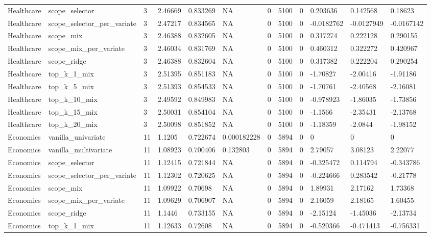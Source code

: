 \begin{tabular}{llllllllllll}
Healthcare & scope\_selector & 3 & 2.46669 & 0.833269 & NA & 0 & 5100 & 0 & 0.203636 & 0.142568 & 0.18623 \\
Healthcare & scope\_selector\_per\_variate & 3 & 2.47217 & 0.834565 & NA & 0 & 5100 & 0 & -0.0182762 & -0.0127949 & -0.0167142 \\
Healthcare & scope\_mix & 3 & 2.46388 & 0.832605 & NA & 0 & 5100 & 0 & 0.317274 & 0.222128 & 0.290155 \\
Healthcare & scope\_mix\_per\_variate & 3 & 2.46034 & 0.831769 & NA & 0 & 5100 & 0 & 0.460312 & 0.322272 & 0.420967 \\
Healthcare & scope\_ridge & 3 & 2.46388 & 0.832604 & NA & 0 & 5100 & 0 & 0.317382 & 0.222204 & 0.290254 \\
Healthcare & top\_k\_1\_mix & 3 & 2.51395 & 0.851183 & NA & 0 & 5100 & 0 & -1.70827 & -2.00416 & -1.91186 \\
Healthcare & top\_k\_5\_mix & 3 & 2.51393 & 0.854533 & NA & 0 & 5100 & 0 & -1.70761 & -2.40568 & -2.16081 \\
Healthcare & top\_k\_10\_mix & 3 & 2.49592 & 0.849983 & NA & 0 & 5100 & 0 & -0.978923 & -1.86035 & -1.73856 \\
Healthcare & top\_k\_15\_mix & 3 & 2.50031 & 0.854104 & NA & 0 & 5100 & 0 & -1.1566 & -2.35431 & -2.13768 \\
Healthcare & top\_k\_20\_mix & 3 & 2.50098 & 0.851852 & NA & 0 & 5100 & 0 & -1.18359 & -2.0844 & -1.98152 \\
Economics & vanilla\_univariate & 11 & 1.1205 & 0.722674 & 0.000182228 & 0 & 5894 & 0 & 0 & 0 & 0 \\
Economics & vanilla\_multivariate & 11 & 1.08923 & 0.700406 & 0.132803 & 0 & 5894 & 0 & 2.79057 & 3.08123 & 2.22077 \\
Economics & scope\_selector & 11 & 1.12415 & 0.721844 & NA & 0 & 5894 & 0 & -0.325472 & 0.114794 & -0.343786 \\
Economics & scope\_selector\_per\_variate & 11 & 1.12302 & 0.720625 & NA & 0 & 5894 & 0 & -0.224666 & 0.283542 & -0.21778 \\
Economics & scope\_mix & 11 & 1.09922 & 0.70698 & NA & 0 & 5894 & 0 & 1.89931 & 2.17162 & 1.73368 \\
Economics & scope\_mix\_per\_variate & 11 & 1.09629 & 0.706907 & NA & 0 & 5894 & 0 & 2.16059 & 2.18165 & 1.60455 \\
Economics & scope\_ridge & 11 & 1.1446 & 0.733155 & NA & 0 & 5894 & 0 & -2.15124 & -1.45036 & -2.13734 \\
Economics & top\_k\_1\_mix & 11 & 1.12633 & 0.72608 & NA & 0 & 5894 & 0 & -0.520366 & -0.471413 & -0.756331 \\

\end{tabular}
